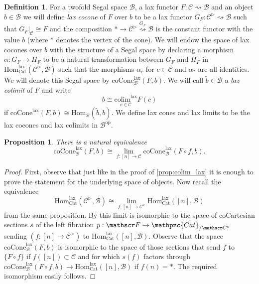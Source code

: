 \documentclass[a4paper, reqno]{amsart}
\newtheorem{prop}[theorem]{Proposition}
\theoremstyle{definition}
\newtheorem{defn}[theorem]{Definition}
\newcommand\cB{\mathscr B}
\newcommand\cC{\mathscr C}
\newcommand\cF{\mathscr F}
\newcommand\mor{\mathrm{Hom}}
\newcommand\op{\mathrm{op}}
\newcommand\cat{\mathrm{Cat}}
\newcommand\ccat{\mathpzc{Cat}}
\newcommand\colim{\mathrm{colim}}
\newcommand\lax{\mathrm{lax}}
\newcommand\coc{\mathrm{coCone}}
\begin{document}
\begin{defn}\label{def:coc}
For a twofold Segal space $\cB$, a lax functor $F:\cC\rightsquigarrow\cB$ and an object $b\in\cB$ we will define \textit{lax cocone} of $F$ over $b$ to be a lax functor $G_F:\cC^\triangleright\rightsquigarrow\cB$ such that $G_F|_{\cC}\cong F$ and the composition  $*\rightarrow \cC^\triangleright \overset{G_F}{\rightsquigarrow}\cB$ is the constant functor with the value $b$ (where $*$ denotes the vertex of the cone). We will endow the space of lax cocones over $b$ with the structure of a Segal space by declaring a morphism $\alpha:G_F\rightarrow H_F$ to be a natural transformation between $G_F$ and $H_F$ in $\mor_\cat^\lax(\cC^\triangleright,\cB)$ such that the morphisms $\alpha_c$ for $c\in\cC$ and $\alpha_*$ are all identities. We will denote this Segal space by $\coc_\cB^\lax(F,b)$. We will call $\widetilde{b}\in\cB$ a \textit{lax colimit} of $F$ and write 
\[b\cong\underset{c\in\cC}{\colim^\lax}F(c)\]
if $\coc^\lax(F,b)\cong\mor_\cB(\widetilde{b},b)$. We define lax cones and lax limits to be the lax cocones and lax colimits in $\cB^\op$.
\end{defn}
\begin{prop}\label{prop:colim_cocone}
There is a natural equivalence
\[\coc_\cB^\lax(F,b)\cong \underset{f:[n]\rightarrow\cC}{\lim}\coc_\cB^\lax(F\circ f,b).\]
\end{prop}
\begin{proof}
First, observe that just like in the proof of \cref{prop:colim_lax} it is enough to prove the statement for the underlying space of objects. Now recall the equivalence
\[\mor_\cat^\lax(\cC^\triangleright,\cB)\cong\underset{f:[n]\rightarrow\cC^\triangleright}{\lim}\mor_\cat^\lax([n],\cB)\]
from the same proposition. By \cite[Corollary 3.3.3.4.]{lurie2009higher} this limit is isomorphic to the space of coCartesian sections $s$ of the left fibration $p:\cF\rightarrow\ccat_{/\cC^\triangleright}$ sending $(f:[n]\rightarrow\cC^\triangleright)$ to $\mor_\cat^\lax([n],\cB)$. Observe that the space $\coc_\cB^\lax(F,b)$ is isomorphic to the space of those sections that send $f$ to $\{F\circ f\}$ if $f([n])\subset\cC$ and for which $s(f)$ factors through $\coc^\lax_\cB(F\circ f,b)\rightarrow\mor_\cat^\lax([n],\cB)$ if $f(n)=*$. The required isomorphism easily follows.
\end{proof}
\end{document}

